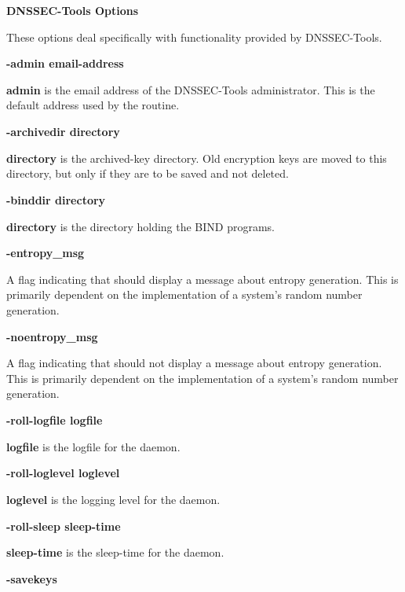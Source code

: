 {\bf DNSSEC-Tools Options}

These options deal specifically with functionality provided by DNSSEC-Tools.

\begin{description}

\item {\bf -admin email-address}\verb" "

{\bf admin} is the email address of the DNSSEC-Tools administrator.  This is the
default address used by the  routine.

\item {\bf -archivedir directory}\verb" "

{\bf directory} is the archived-key directory.  Old encryption keys are moved to
this directory, but only if they are to be saved and not deleted.

\item {\bf -binddir directory}\verb" "

{\bf directory} is the directory holding the BIND programs.

\item {\bf -entropy\_msg}\verb" "

A flag indicating that  should display a message about entropy
generation.  This is primarily dependent on the implementation of a system's
random number generation.

\item {\bf -noentropy\_msg}\verb" "

A flag indicating that  should not display a message about
entropy generation.  This is primarily dependent on the implementation of
a system's random number generation.

\item {\bf -roll-logfile logfile}\verb" "

{\bf logfile} is the logfile for the  daemon.

\item {\bf -roll-loglevel loglevel}\verb" "

{\bf loglevel} is the logging level for the  daemon.

\item {\bf -roll-sleep sleep-time}\verb" "

{\bf sleep-time} is the sleep-time for the  daemon.

\item {\bf -savekeys}\verb" "


\end{description}
